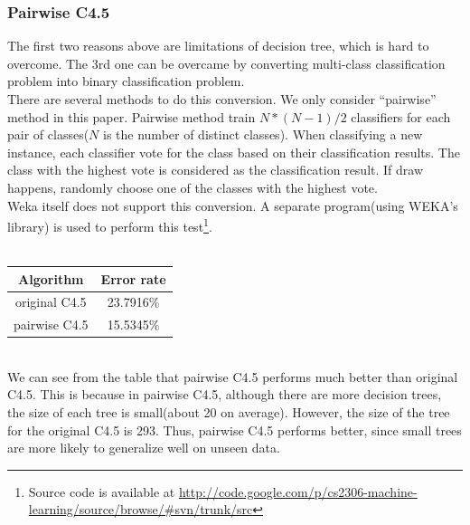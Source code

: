 \documentclass[a4paper,11pt]{article}
\begin{document}
\subsubsection{Pairwise C4.5}
The first two reasons above are limitations of decision tree, which is hard to overcome. The 3rd one can be overcame by converting multi-class classification problem into binary classification problem.\\
There are several methods to do this conversion. We only consider ``pairwise'' method in this paper. Pairwise method train $N*(N-1)/2$ classifiers for each pair of classes($N$ is the number of distinct classes). When classifying a new instance, each classifier vote for the class based on their classification results. The class with the highest vote is considered as the classification result. If draw happens, randomly choose one of the classes with the highest vote.\\
Weka itself does not support this conversion. A separate program(using WEKA's library) is used to perform this test\footnote{Source code is available at \url{http://code.google.com/p/cs2306-machine-learning/source/browse/#svn/trunk/src}}.\\
\vspace{0.5cm}\\
\begin{tabular}{c c}
Algorithm	& Error rate\\
\hline \hline
original C4.5	& 23.7916\%\\
pairwise C4.5	& 15.5345\%\\
\end{tabular}
\vspace{0.5cm}\\
We can see from the table that pairwise C4.5 performs much better than original C4.5. This is because in pairwise C4.5, although there are more decision trees, the size of each tree is small(about 20 on average). However, the size of the tree for the original C4.5 is 293. Thus, pairwise C4.5 performs better, since small trees are more likely to generalize well on unseen data.
\end{document}
